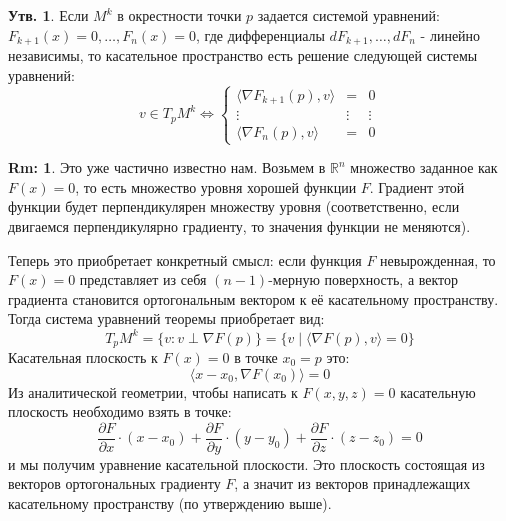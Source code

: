 \documentclass[12pt]{article}
\newcommand{\MR}{\mathbb{R}}
\theoremstyle{definition}
\newtheorem{rem}{Rm:}
\newtheorem{prop}{Утв.}
\begin{document}
\begin{prop}
	Если $M^k$ в окрестности точки $p$ задается системой уравнений: $F_{k+1}(x) = 0, \dotsc, F_n(x) = 0$, где дифференциалы $dF_{k+1}, \dotsc, dF_n$ - линейно независимы, то касательное пространство есть решение следующей системы уравнений: 
	$$
		v \in T_pM^k \Leftrightarrow 
		\left\{
			\begin{array}{ccc}
				\langle \nabla F_{k+1}(p),v \rangle & =& 0\\
				\vdots & \vdots & \vdots \\
				\langle \nabla F_n(p),v \rangle &=& 0
			\end{array}
		\right.
	$$
\end{prop}
\begin{rem}
	Это уже частично известно нам. Возьмем в $\MR^n$ множество заданное как $F(x) = 0$, то есть множество уровня хорошей функции $F$. Градиент этой функции будет перпендикулярен множеству уровня (соответственно, если двигаемся перпендикулярно градиенту, то значения функции не меняются). 
	
	Теперь это приобретает конкретный смысл: если функция $F$ невырожденная, то $F(x) = 0$ представляет из себя $(n-1)$-мерную поверхность, а вектор градиента становится ортогональным вектором к её касательному пространству. Тогда система уравнений теоремы приобретает вид:
	$$
		T_p M^k = \{v \colon v \perp \nabla F(p)\} = \{v \mid \langle \nabla F(p), v \rangle = 0\}	
	$$
	Касательная плоскость к $F(x) = 0$ в точке $x_0 = p$ это: 
	$$
		\langle x - x_0, \nabla F(x_0) \rangle = 0
	$$ 
	Из аналитической геометрии, чтобы написать к $F(x,y,z) = 0$ касательную плоскость необходимо взять в точке:
	$$
		\dfrac{\partial F}{\partial x}{\cdot}(x - x_0) + \dfrac{\partial F}{\partial y}{\cdot}(y - y_0) + \dfrac{\partial F}{\partial z}{\cdot}(z - z_0) = 0
	$$ 
	и мы получим уравнение касательной плоскости. Это плоскость состоящая из векторов ортогональных градиенту $F$, а значит из векторов принадлежащих касательному пространству (по утверждению выше).
\end{rem}
\end{document}
